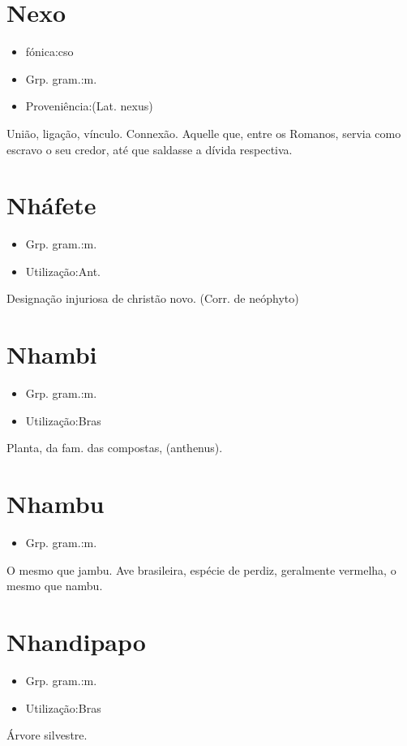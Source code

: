 \section{Nexo}
\begin{itemize}
\item {fónica:cso}
\end{itemize}
\begin{itemize}
\item {Grp. gram.:m.}
\end{itemize}
\begin{itemize}
\item {Proveniência:(Lat. \textunderscore nexus\textunderscore )}
\end{itemize}
União, ligação, vínculo.
Connexão.
Aquelle que, entre os Romanos, servia como escravo o seu credor, até que saldasse a dívida respectiva.
\section{Nháfete}
\begin{itemize}
\item {Grp. gram.:m.}
\end{itemize}
\begin{itemize}
\item {Utilização:Ant.}
\end{itemize}
Designação injuriosa de christão novo.
(Corr. de \textunderscore neóphyto\textunderscore )
\section{Nhambi}
\begin{itemize}
\item {Grp. gram.:m.}
\end{itemize}
\begin{itemize}
\item {Utilização:Bras}
\end{itemize}
Planta, da fam. das compostas, (\textunderscore anthenus\textunderscore ).
\section{Nhambu}
\begin{itemize}
\item {Grp. gram.:m.}
\end{itemize}
O mesmo que \textunderscore jambu\textunderscore .
Ave brasileira, espécie de perdiz, geralmente vermelha, o mesmo que \textunderscore nambu\textunderscore .
\section{Nhandipapo}
\begin{itemize}
\item {Grp. gram.:m.}
\end{itemize}
\begin{itemize}
\item {Utilização:Bras}
\end{itemize}
Árvore silvestre.
